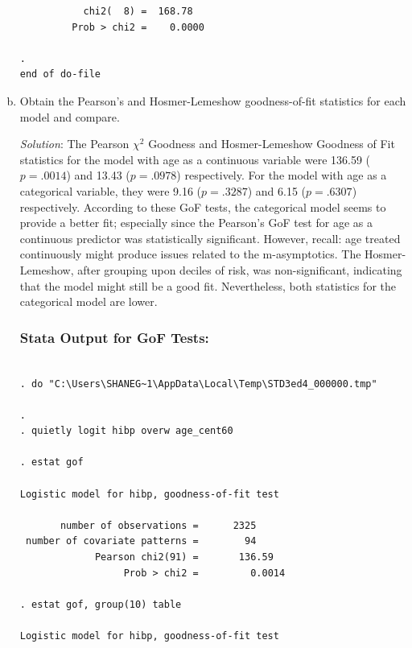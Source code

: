 \documentclass{article}
\begin{document}
\begin{enumerate}[a.]
\begin{verbatim}
           chi2(  8) =  168.78
         Prob > chi2 =    0.0000

. 
end of do-file

\end{verbatim}


    
    \item  Obtain the Pearson’s and Hosmer-Lemeshow goodness-of-fit statistics for each model and compare.
    
\textit{Solution}: The Pearson $\chi^2$ Goodness and Hosmer-Lemeshow Goodness of Fit statistics for the model with age as a continuous variable were 136.59 ($p = .0014$) and 13.43 ($p=.0978$) respectively. For the model with age as a categorical variable, they were 9.16 ($p=.3287$) and 6.15 ($p=.6307$) respectively. According to these GoF tests, the categorical model seems to provide a better fit; especially since the Pearson's GoF test for age as a continuous predictor was statistically significant. However, recall: age treated continuously might produce issues related to the m-asymptotics. The Hosmer-Lemeshow, after grouping upon deciles of risk, was non-significant, indicating that the model might still be a good fit. Nevertheless, both statistics for the categorical model are lower.

\subsubsection*{Stata Output for GoF Tests:}
\begin{verbatim}

. do "C:\Users\SHANEG~1\AppData\Local\Temp\STD3ed4_000000.tmp"

. 
. quietly logit hibp overw age_cent60

. estat gof

Logistic model for hibp, goodness-of-fit test

       number of observations =      2325
 number of covariate patterns =        94
             Pearson chi2(91) =       136.59
                  Prob > chi2 =         0.0014

. estat gof, group(10) table

Logistic model for hibp, goodness-of-fit test


\end{verbatim}
\end{enumerate}
\end{document}
